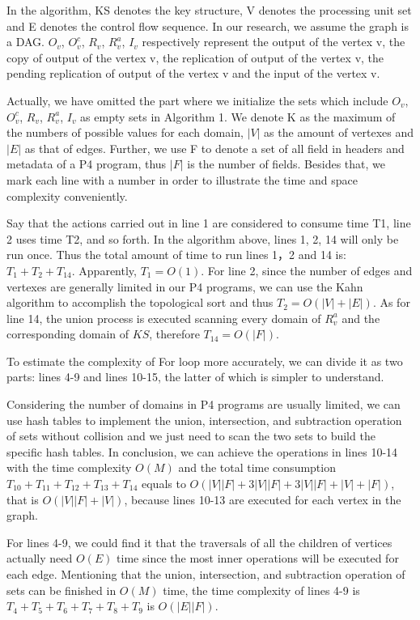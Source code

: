 In the algorithm, KS denotes the key structure, V denotes the processing unit set and E denotes the control flow sequence. In our research, we assume the graph is a DAG. $O_{v}$,  $O^{c}_{v}$, $R_{v}$, $R^{a}_{v}$, $I_{v}$ respectively represent the output of the vertex v, the copy of output of the vertex v, the replication of output of the vertex v, the pending replication of output of the vertex v and the input of the vertex v.

Actually, we have omitted the part where we initialize the sets which include $O_{v}$,  $O^{c}_{v}$, $R_{v}$, $R^{a}_{v}$, $I_{v}$ as empty sets in Algorithm 1. We denote K as the maximum of the numbers of possible values for each domain, $|V|$ as the amount of vertexes and $|E|$ as that of edges. Further, we use F to denote a set of all field in headers and metadata of a P4 program, thus $|F|$ is the number of fields. Besides that, we mark each line with a number in order to illustrate the time and space complexity conveniently.

Say that the actions carried out in line 1 are considered to consume time T1, line 2 uses time T2, and so forth.
In the algorithm above, lines 1, 2, 14 will only be run once. Thus the total amount of time to run lines 1，2 and 14 is:
$ T_{1}+T_{2}+T_{14}.$ Apparently, $ T_{1} = O(1)$. For line 2, since the number of edges and vertexes are generally limited in our P4 programs, we can use the Kahn algorithm to accomplish the topological sort and thus $ T_{2} = O(|V| + |E|)$. As for line 14, the union process is executed scanning every domain of $R^{a}_{v}$ and the corresponding domain of $KS$, therefore $ T_{14} = O(|F|)$.

To estimate the complexity of For loop more accurately, we can divide it as two parts: lines 4-9 and lines 10-15, the latter of which is simpler to understand.

Considering the number of domains in P4 programs are usually limited, we can use hash tables to implement the union, intersection, and subtraction operation of sets without collision and we just need to scan the two sets to build the specific hash tables. In conclusion, we can achieve the operations in lines 10-14 with the time complexity $O(M)$ and the total time consumption $T_{10} + T_{11} + T_{12} + T_{13} + T_{14}$ equals to $O( |V||F| + 3|V||F| + 3|V||F| + |V|+|F|)$, that is $O(|V||F| + |V|)$, because lines 10-13 are executed for each vertex in the graph.


For lines 4-9, we could find it that the traversals of all the children of vertices actually need $O(E)$ time since the most inner operations will be executed for each edge. Mentioning that the union, intersection, and subtraction operation of sets can be finished in $O(M)$ time, the time complexity of lines 4-9 is $T_{4} + T_{5} + T_{6} + T_{7} + T_{8} + T_{9}$ is $O(|E||F|)$.

